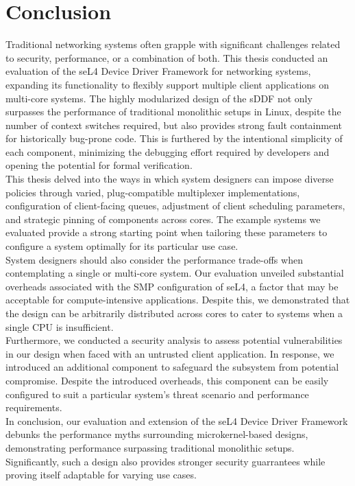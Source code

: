 \chapter{Conclusion}\label{ch:conclusion}

Traditional networking systems often grapple with significant challenges related to security, performance, or a 
combination of both. This thesis conducted an evaluation of the seL4 Device Driver Framework for networking systems,
expanding its functionality to flexibly support multiple client applications on multi-core systems. The highly
modularized design of the sDDF not only surpasses the performance of traditional monolithic setups in Linux,
despite the number of context switches required, but also provides strong fault containment for historically
bug-prone code. This is furthered by the intentional simplicity of each component, minimizing the debugging effort
required by developers and opening the potential for formal verification. \\

This thesis delved into the ways in
which system designers can impose diverse policies through varied, plug-compatible multiplexer implementations,
configuration of client-facing queues, adjustment of client scheduling parameters, and strategic pinning of
components across cores. The example systems we evaluated provide a strong starting point when tailoring these
parameters to configure a system optimally for its particular use case. \\

System designers should also consider the
performance trade-offs when contemplating a single or multi-core system. Our evaluation unveiled substantial
overheads associated with the SMP configuration of seL4, a factor that may be acceptable for compute-intensive
applications. Despite this, we demonstrated that the design can be arbitrarily distributed across cores to cater
to systems when a single CPU is insufficient. \\

Furthermore, we conducted a security analysis to assess potential
vulnerabilities in our design when faced with an untrusted client application. In response, we introduced an
additional component to safeguard the subsystem from potential compromise. Despite the introduced overheads,
this component can be easily configured to suit a particular system's threat scenario and performance
requirements. \\

In conclusion, our evaluation and extension of the seL4 Device Driver Framework debunks
the performance myths surrounding microkernel-based designs, demonstrating performance surpassing traditional
monolithic setups. Significantly, such a design also provides stronger security guarrantees while proving itself 
adaptable for varying use cases.

